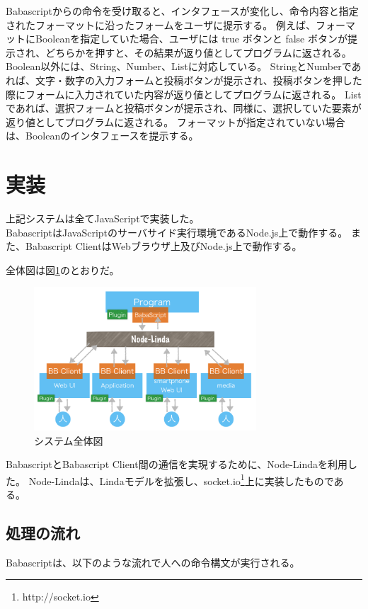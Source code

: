 \documentclass[twoside]{wiss}
\begin{document}
Babascriptからの命令を受け取ると、インタフェースが変化し、命令内容と指定されたフォーマットに沿ったフォームをユーザに提示する。
例えば、フォーマットにBooleanを指定していた場合、ユーザには true ボタンと false ボタンが提示され、どちらかを押すと、その結果が返り値としてプログラムに返される。
Boolean以外には、String、Number、Listに対応している。
StringとNumberであれば、文字・数字の入力フォームと投稿ボタンが提示され、投稿ボタンを押した際にフォームに入力されていた内容が返り値としてプログラムに返される。
Listであれば、選択フォームと投稿ボタンが提示され、同様に、選択していた要素が返り値としてプログラムに返される。
フォーマットが指定されていない場合は、Booleanのインタフェースを提示する。

\section{実装}

上記システムは全てJavaScriptで実装した。\\
BabascriptはJavaScriptのサーバサイド実行環境であるNode.js上で動作する。
また、Babascript ClientはWebブラウザ上及びNode.js上で動作する。

全体図は図\ref{system}のとおりだ。

\begin{figure}[h]
  \includegraphics[width=83mm, bb=0 0 928 599]{./images/system.png}
  \caption{システム全体図}  
  \label{system}
\end{figure}

BabascriptとBabascript Client間の通信を実現するために、Node-Linda\cite{nodelinda}を利用した。
Node-Lindaは、Linda\cite{linda}モデルを拡張し、socket.io\footnote{http://socket.io}上に実装したものである。

\subsection{処理の流れ}

Babascriptは、以下のような流れで人への命令構文が実行される。
\end{document}
